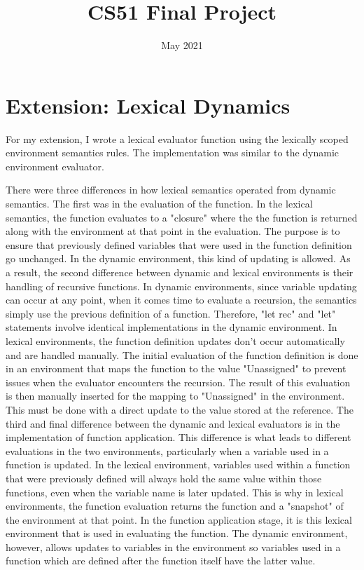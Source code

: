\documentclass{article}
\title{CS51 Final Project}
\date{May 2021}
\begin{document}
\maketitle

\section*{Extension: Lexical Dynamics}

For my extension, I wrote a lexical evaluator function using the lexically scoped environment semantics rules. The implementation was similar to the dynamic environment evaluator.

There were three differences in how lexical semantics operated from dynamic semantics. The first was in the evaluation of the function. In the lexical semantics, the function evaluates to a "closure" where the the function is returned along with the environment at that point in the evaluation. The purpose is to ensure that previously defined variables that were used in the function definition go unchanged. In the dynamic environment, this kind of updating is allowed. As a result, the second difference between dynamic and lexical environments is their handling of recursive functions. In dynamic environments, since variable updating can occur at any point, when it comes time to evaluate a recursion, the semantics simply use the previous definition of a function. Therefore, "let rec" and "let" statements involve identical implementations in the dynamic environment. In lexical environments, the function definition updates don't occur automatically and are handled manually. The initial evaluation of the function definition is done in an environment that maps the function to the value "Unassigned" to prevent issues when the evaluator encounters the recursion. The result of this evaluation is then manually inserted for the mapping to "Unassigned" in the environment. This must be done with a direct update to the value stored at the reference. The third and final difference between the dynamic and lexical evaluators is in the implementation of function application. This difference is what leads to different evaluations in the two environments, particularly when a variable used in a function is updated. In the lexical environment, variables used within a function that were previously defined will always hold the same value within those functions, even when the variable name is later updated. This is why in lexical environments, the function evaluation returns the function and a "snapshot" of the environment at that point. In the function application stage, it is this lexical environment that is used in evaluating the function. The dynamic environment, however, allows updates to variables in the environment so variables used in a function which are defined after the function itself have the latter value.
\end{document}
